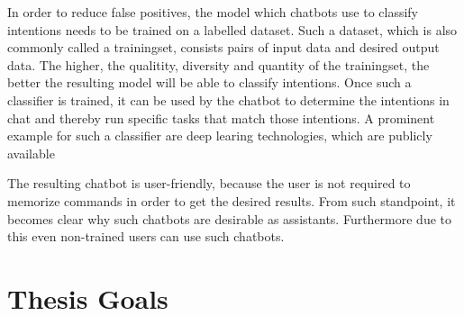In order to reduce false positives, the model which chatbots use to classify intentions needs to be trained on a labelled dataset. Such a dataset, which is also commonly called a trainingset, consists pairs of input data and desired output data. The higher, the qualitity, diversity and quantity of the trainingset, the better the resulting model will be able to classify intentions.
Once such a classifier is trained, it can be used by the chatbot to determine the intentions in chat and thereby run specific tasks that match those intentions.
A prominent example for such a classifier are deep learing technologies, which are publicly available \cite{NLKl19}

The resulting chatbot is user-friendly, because the user is not required to memorize commands in order to get the desired results. From such standpoint, it becomes clear why such chatbots are desirable as assistants. Furthermore due to this even non-trained users can use such chatbots.
\newpage

\section{Thesis Goals}

\blankpage
